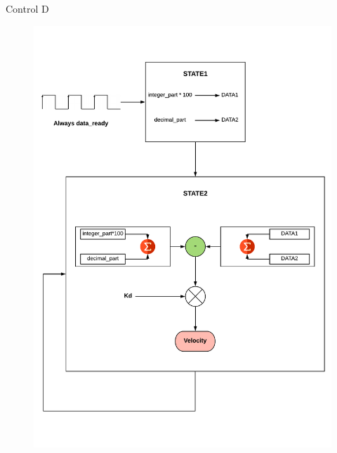 \documentclass{beamer}
\begin{document}
\begin{frame}{Control D}
			\begin{figure}[H]
			\center
			\includegraphics[trim = 0cm 0cm 0mm 2cm, clip,scale=0.3]{imagenes/Balancing_robot/D.pdf}
		\end{figure}
\end{frame}
\end{document}
